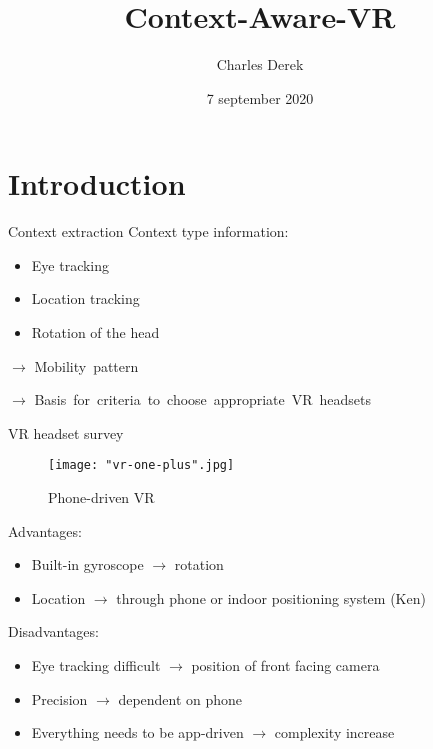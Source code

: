 \documentclass{beamer}
\title[Your Short Title]{Context-Aware-VR}
\author{Charles Derek}
\institute{University of Antwerp}
\date{7 september 2020}
\begin{document}
\begin{frame}
  \titlepage
\end{frame}


\section{Introduction}

\begin{frame}{Context extraction}
Context type information: 

\begin{itemize}
	\item Eye tracking
	\item Location tracking 
	\item Rotation of the head
\end{itemize}	
\vspace{0.8cm}
	
$\rightarrow$ Mobility\ pattern

\vspace{1.23cm}

$\rightarrow$ Basis\ for\ criteria\ to\ choose\ appropriate\ VR\ headsets
\end{frame}


\begin{frame}{VR headset survey}
	\begin{figure}
		\texttt{[image: "vr-one-plus".jpg]}
		\caption{Phone-driven VR}
	\end{figure}
	
	Advantages:
	\begin{itemize}
		\item Built-in gyroscope $\rightarrow$ rotation
		\item Location $\rightarrow$ through phone or indoor positioning system (Ken)
	\end{itemize}
	
	Disadvantages:
	\begin{itemize}
		\item Eye tracking difficult $\rightarrow$ position of front facing camera
		\item Precision $\rightarrow$ dependent on phone
		\item Everything needs to be app-driven $\rightarrow$ complexity increase
	\end{itemize}
\end{frame}
\end{document}
